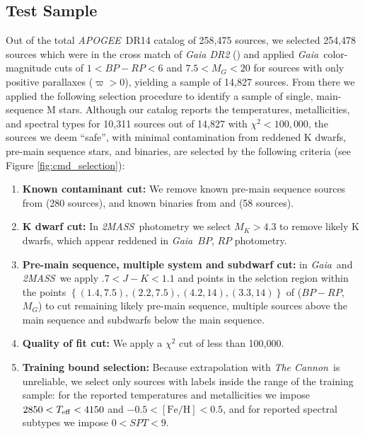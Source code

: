 \documentclass[modern]{aastex62}
\newcommand{\apogee}{\textsl{APOGEE}}
\newcommand{\thecannon}{\textsl{The Cannon}}
\newcommand{\gaia}{\textsl{Gaia}}
\newcommand{\zmass}{\textsl{2MASS}}
\newcommand{\feh}{[{\mathrm{Fe}/\mathrm{H}}]}
\begin{document}
\subsection{Test Sample \label{subsec:test_selection}} 
Out of the total \apogee\ DR14 catalog of 258,475 sources, we selected 254,478 sources which were in the cross match of \textsl{Gaia DR2} (\citealt{Brown:2018}) and applied \gaia\ color-magnitude cuts of $1<BP-RP<6$ and $7.5<M_G<20$ for sources with only positive parallaxes ($\varpi>0$), yielding a sample of 14,827 sources. From there we applied the following selection procedure to identify a sample of single, main-sequence M stars. Although our catalog reports the temperatures, metallicities, and spectral types for 10,311 sources out of 14,827 with $\chi^2<100,000$, the sources we deem ``safe'', with minimal contamination from reddened K dwarfs, pre-main sequence stars, and binaries, are selected by the following criteria (see Figure \ref{fig:cmd_selection}):

\begin{enumerate}
\item \textbf{Known contaminant cut:} We remove known pre-main sequence sources from \citealt{Cottaar:2014} (280 sources), and known binaries from \citealt{ElBadry:2018} and \citealt{Skinner:2018} (58 sources).

\item \textbf{K dwarf cut:} In \zmass\ photometry we select $M_K > 4.3$ to remove likely K dwarfs, which appear reddened in \gaia\ $BP$, $RP$ photometry.

\item \textbf{Pre-main sequence, multiple system and subdwarf cut:} in \gaia\ and \zmass\ we apply $.7<J-K<1.1$ and points in the selction region within the points $\left\{ (1.4, 7.5), (2.2, 7.5), (4.2, 14), (3.3, 14) \right\}$ of ($BP-RP$, $M_G$) to cut remaining likely pre-main sequence, multiple sources above the main sequence and subdwarfs below the main sequence.

\item \textbf{Quality of fit cut:} We apply a $\chi^2$ cut of less than 100,000.

\item \textbf{Training bound selection:} Because extrapolation with \thecannon\ is unreliable, we select only sources with labels inside the range of the training sample: for the reported temperatures and metallicities we impose $2850<T_{\rm eff}<4150$ and $-0.5<\feh<0.5$, and for reported spectral subtypes we impose $0<SPT<9$.
\end{enumerate}
\end{document}
